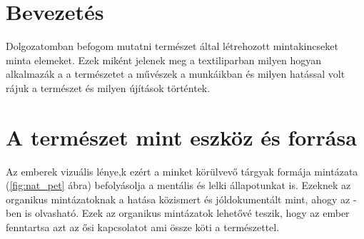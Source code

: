 \documentclass[fontsize=12pt, appendixprefix=true]{scrreprt}
\begin{document}




\tableofcontents


\chapter{Bevezetés}
Dolgozatomban befogom mutatni természet által létrehozott mintakincseket minta elemeket.
Ezek miként jelenek meg a textiliparban milyen hogyan alkalmazák a a természetet a művészek a munkáikban és milyen hatással volt rájuk a természet 
és milyen újítások történtek.


\chapter{A természet mint eszköz és forrása}

Az emberek vizuális lénye,k ezért a minket körülvevő tárgyak formája mintázata (\ref{fig:nat_pet} ábra) befolyásolja a mentális és lelki állapotunkat is. Ezeknek az organikus mintázatoknak a hatása közismert és jóldokumentált mint, ahogy az \cite{jo2019physiological} -ben is olvasható. Ezek az organikus mintázatok lehetővé teszik, hogy az ember fenntartsa azt az ősi kapcsolatot ami össze köti a természettel. 
\end{document}
